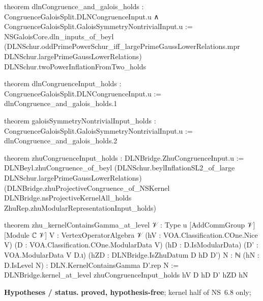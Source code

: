 \documentclass[11pt,openany]{book}
\newcommand{\lean}[1]{\texttt{\detokenize{#1}}}
\theoremstyle{definition}
\theoremstyle{plain}
\begin{document}
\begin{leancode}
theorem dlnCongruence_and_galois_holds :
    CongruenceGaloisSplit.DLNCongruenceInput.{u} ∧
      CongruenceGaloisSplit.GaloisSymmetryNontrivialInput.{u} :=
  NSGaloisCore.dln_inputs_of_beyl
    (DLNSchur.oddPrimePowerSchur_iff_largePrimeGaussLowerRelations.mpr
      DLNSchur.largePrimeGaussLowerRelations)
    DLNSchur.twoPowerInflationFromTwo_holds

theorem dlnCongruenceInput_holds : CongruenceGaloisSplit.DLNCongruenceInput.{u} :=
  dlnCongruence_and_galois_holds.1

theorem galoisSymmetryNontrivialInput_holds :
    CongruenceGaloisSplit.GaloisSymmetryNontrivialInput.{u} :=
  dlnCongruence_and_galois_holds.2

theorem zhuCongruenceInput_holds : DLNBridge.ZhuCongruenceInput.{u} :=
  DLNBeyl.zhuCongruence_of_beyl
    (DLNSchur.beylInflationSL2_of_large DLNSchur.largePrimeGaussLowerRelations)
    (DLNBridge.zhuProjectiveCongruence_of_NSKernel DLNBridge.nsProjectiveKernelAll_holds
      ZhuRep.zhuModularRepresentationInput_holds)

theorem zhu_kernelContainsGamma_at_level {𝒱 : Type u} [AddCommGroup 𝒱] [Module ℂ 𝒱]
    {V : VertexOperatorAlgebra 𝒱} (hV : VOA.Classification.COne.Nice V)
    (D : VOA.Classification.COne.ModularData V) (hD : D.IsModularData)
    (D' : VOA.ModularData V D.ι) (hZD : DLNBridge.IsZhuDatum D hD D') {N : ℕ}
    (hN : D.IsLevel N) : DLN.KernelContainsGamma D'.rep N :=
  DLNBridge.kernel_at_level zhuCongruenceInput_holds hV D hD D' hZD hN
\end{leancode}
\noindent\textbf{Hypotheses / status.} \textbf{proved, hypothesis-free}; kernel half of NS~6.8 only; \lean{VOA.pbw}\par
\medskip
\endgroup
\setcounter{chapter}{21}
\end{document}
